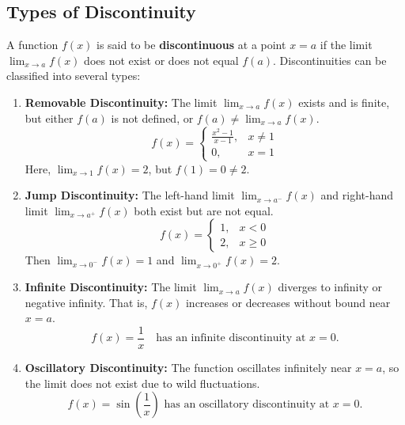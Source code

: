 \documentclass[11pt]{article}
\begin{document}
\subsection{Types of Discontinuity}
A function $f(x)$ is said to be \textbf{discontinuous} at a point $x = a$ if the limit $\displaystyle\lim_{x \to a} f(x)$ does not exist or does not equal $f(a)$. Discontinuities can be classified into several types:
\begin{enumerate}
  \item \textbf{Removable Discontinuity:}  
  The limit $\displaystyle\lim_{x \to a} f(x)$ exists and is finite, but either $f(a)$ is not defined, or $\displaystyle f(a) \ne \lim_{x \to a} f(x)$.  
  \[
  f(x) = 
  \begin{cases}
    \displaystyle\frac{x^2 - 1}{x - 1}, & x \ne 1 \\
    0, & x = 1
  \end{cases}
  \]
  Here, $\displaystyle\lim_{x \to 1} f(x) = 2$, but $f(1) = 0 \ne 2$.

  \item \textbf{Jump Discontinuity:}  
  The left-hand limit $\displaystyle\lim_{x \to a^-} f(x)$ and right-hand limit $\displaystyle\lim_{x \to a^+} f(x)$ both exist but are not equal.  
  \[
    f(x) = 
    \begin{cases}
        1, & x < 0 \\
        2, & x \geq 0
    \end{cases}
  \]
  Then $\displaystyle\lim_{x \to 0^-} f(x) = 1$ and $\displaystyle\lim_{x \to 0^+} f(x) = 2$.

  \item \textbf{Infinite Discontinuity:}  
  The limit $\displaystyle\lim_{x \to a} f(x)$ diverges to infinity or negative infinity. That is, $f(x)$ increases or decreases without bound near $x = a$.  
  \[
    f(x) = \frac{1}{x}
    \quad \text{has an infinite discontinuity at } x = 0.
  \]

  \item \textbf{Oscillatory Discontinuity:}  
  The function oscillates infinitely near $x = a$, so the limit does not exist due to wild fluctuations.  
  \[
    f(x) = \sin\left(\frac{1}{x}\right)\text{ has an oscillatory discontinuity at } x = 0.
  \]
\end{enumerate}
\end{document}
